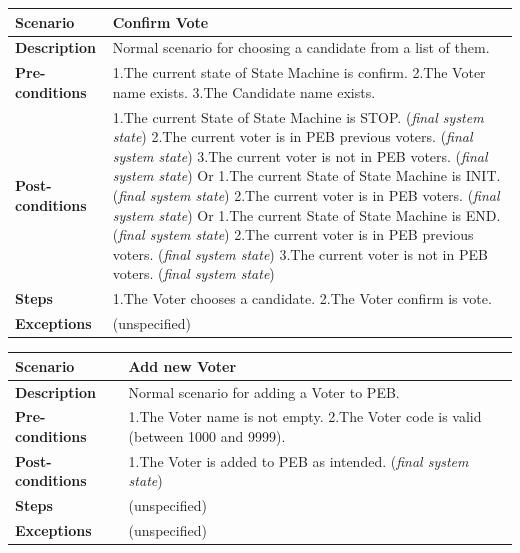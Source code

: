 \documentclass{article}
\begin{document}
\begin{center}
    \begin{tabular}{ | l | p{9cm} |}
    \hline
   \textbf{Scenario}	& \textbf{Confirm Vote}  \\ \hline
    \textbf{Description}	& Normal scenario for choosing a candidate from a list of them.\\ \hline
   \textbf{Pre-conditions}	& 1.The current state of State Machine is confirm.\linebreak
2.The Voter name exists.\linebreak
3.The Candidate name exists.

\\ \hline
 \textbf{Post-conditions} & 1.The current State of State Machine is STOP. (\textit{final system state})\linebreak
2.The current voter is in PEB previous voters. (\textit{final system state})\linebreak
3.The current voter is not in PEB voters. (\textit{final system state})\linebreak
Or\linebreak
1.The current State of State Machine is INIT. (\textit{final system state})\linebreak
2.The current voter is in PEB voters. (\textit{final system state})\linebreak
Or\linebreak
1.The current State of State Machine is END. (\textit{final system state})\linebreak
2.The current voter is in PEB previous voters. (\textit{final system state})\linebreak
3.The current voter is not in PEB voters. (\textit{final system state})
   \\ \hline
   \textbf{Steps} &1.The Voter chooses a candidate.\linebreak
2.The Voter confirm is vote.
 \\ 
    \hline
\textbf{Exceptions}& 	(unspecified)
 \\ 
    \hline
    \end{tabular}
\end{center}

\begin{center}
    \begin{tabular}{ | l | p{9cm} |}
    \hline
   \textbf{Scenario}	& \textbf{Add new Voter }  \\ \hline
    \textbf{Description}	&Normal scenario for adding a Voter to PEB.\\ \hline
   \textbf{Pre-conditions}	&1.The Voter name is not empty.\linebreak
2.The Voter code is valid (between 1000 and 9999).
\\ \hline
 \textbf{Post-conditions} & 1.The Voter is added to PEB as intended. (\textit{final system state}) \\ \hline
   \textbf{Steps} &  (unspecified)
 \\ 
    \hline
\textbf{Exceptions}& 	(unspecified)
 \\ 
    \hline
    \end{tabular}
\end{center}
\end{document}
